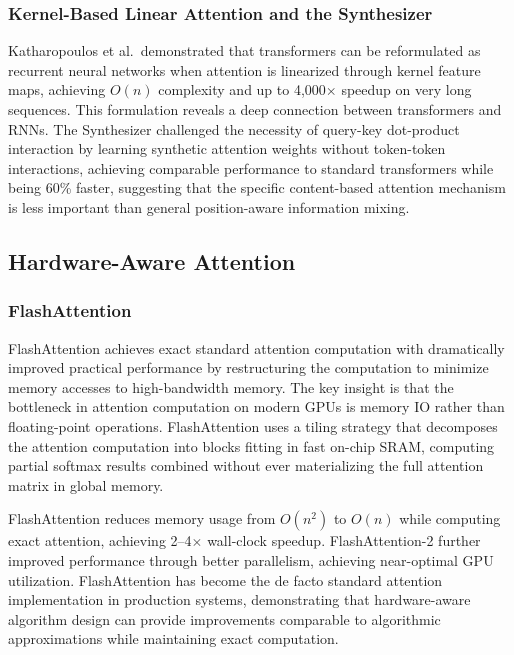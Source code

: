 \documentclass[11pt,letterpaper]{article}
\begin{document}
\subsubsection{Kernel-Based Linear Attention and the Synthesizer}

Katharopoulos et al.\ demonstrated that transformers can be reformulated as recurrent neural networks when attention is linearized through kernel feature maps, achieving $O(n)$ complexity and up to 4,000$\times$ speedup on very long sequences. This formulation reveals a deep connection between transformers and RNNs. The Synthesizer challenged the necessity of query-key dot-product interaction by learning synthetic attention weights without token-token interactions, achieving comparable performance to standard transformers while being 60\% faster, suggesting that the specific content-based attention mechanism is less important than general position-aware information mixing.

\subsection{Hardware-Aware Attention}

\subsubsection{FlashAttention}

FlashAttention \cite{dao2022flashattention} achieves exact standard attention computation with dramatically improved practical performance by restructuring the computation to minimize memory accesses to high-bandwidth memory. The key insight is that the bottleneck in attention computation on modern GPUs is memory IO rather than floating-point operations. FlashAttention uses a tiling strategy that decomposes the attention computation into blocks fitting in fast on-chip SRAM, computing partial softmax results combined without ever materializing the full attention matrix in global memory.

FlashAttention reduces memory usage from $O(n^2)$ to $O(n)$ while computing exact attention, achieving 2--4$\times$ wall-clock speedup. FlashAttention-2 \cite{dao2023flashattention2} further improved performance through better parallelism, achieving near-optimal GPU utilization. FlashAttention has become the de facto standard attention implementation in production systems, demonstrating that hardware-aware algorithm design can provide improvements comparable to algorithmic approximations while maintaining exact computation.
\end{document}
